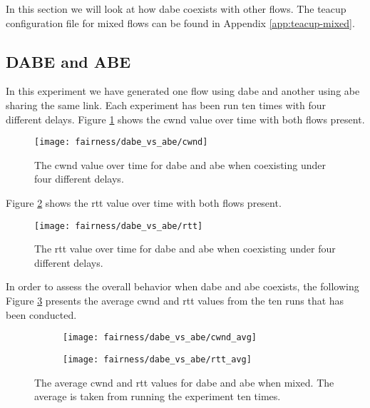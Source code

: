 In this section we will look at how \gls{dabe} coexists with other flows. The \gls{teacup} configuration file for mixed flows can be found in Appendix \ref{app:teacup-mixed}.


\subsection{DABE and ABE}

In this experiment we have generated one flow using \gls{dabe} and another using \gls{abe} sharing the same link. Each experiment has been run ten times with four different delays. Figure \ref{fig:dabe_and_abe_cwnd} shows the \gls{cwnd} value over time with both flows present.

\begin{figure}[H]
    \centering
    \texttt{[image: fairness/dabe\_vs\_abe/cwnd]}
    \captionsetup{width=1.0\linewidth}
    \caption{The \gls{cwnd} value over time for \gls{dabe} and \gls{abe} when coexisting under four different delays.}
    \label{fig:dabe_and_abe_cwnd}
\end{figure}

Figure \ref{fig:dabe_and_abe_rtt} shows the \gls{rtt} value over time with both flows present.

\begin{figure}[H]
    \centering
    \texttt{[image: fairness/dabe\_vs\_abe/rtt]}
    \captionsetup{width=1.0\linewidth}
    \caption{The \gls{rtt} value over time for \gls{dabe} and \gls{abe} when coexisting under four different delays.}
    \label{fig:dabe_and_abe_rtt}
\end{figure}

In order to assess the overall behavior when \gls{dabe} and \gls{abe} coexists, the following Figure \ref{fig:dabe_and_abe_avg} presents the average \gls{cwnd} and \gls{rtt} values from the ten runs that has been conducted.

\begin{figure}[H]
    \centering
    \begin{subfigure}{0.5\linewidth}
        \centering
        \texttt{[image: fairness/dabe\_vs\_abe/cwnd\_avg]}
    \end{subfigure}%
    \begin{subfigure}{0.5\linewidth}
        \centering
        \texttt{[image: fairness/dabe\_vs\_abe/rtt\_avg]}
    \end{subfigure}
    \caption{The average \gls{cwnd} and \gls{rtt} values for \gls{dabe} and \gls{abe} when mixed. The average is taken from running the experiment ten times.}
    \label{fig:dabe_and_abe_avg}
\end{figure}

